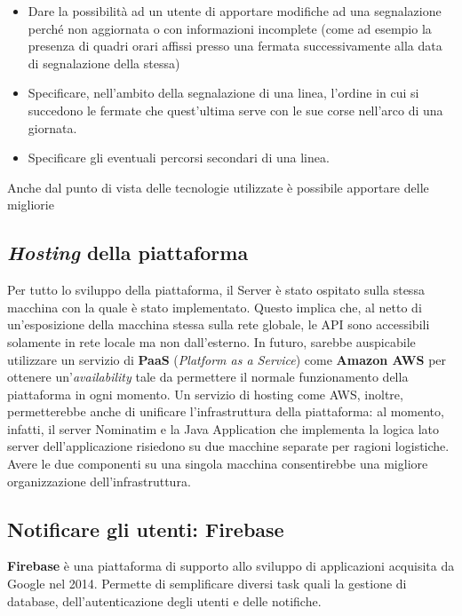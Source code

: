 		\begin{itemize}
			\item Dare la possibilità ad un utente di apportare modifiche ad una segnalazione perché non aggiornata o con informazioni incomplete (come ad esempio la presenza di quadri orari affissi presso una fermata successivamente alla data di segnalazione della stessa)
			\item Specificare, nell'ambito della segnalazione di una linea, l'ordine in cui si succedono le fermate che quest'ultima serve con le sue corse nell'arco di una giornata.
			\item Specificare gli eventuali percorsi secondari di una linea. 
		\end{itemize}

		Anche dal punto di vista delle tecnologie utilizzate è possibile apportare delle migliorie 

		\subsection{\textit{Hosting} della piattaforma}
			Per tutto lo sviluppo della piattaforma, il Server è stato ospitato sulla stessa macchina con la quale è stato implementato. Questo implica che, al netto di un'esposizione della macchina stessa sulla rete globale, le API sono accessibili solamente in rete locale ma non dall'esterno. In futuro, sarebbe auspicabile utilizzare un servizio di \textbf{PaaS} (\textit{Platform as a Service}) come \textbf{Amazon AWS} per ottenere un'\textit{availability} tale da permettere il normale funzionamento della piattaforma in ogni momento. Un servizio di hosting come AWS, inoltre, permetterebbe anche di unificare l'infrastruttura della piattaforma: al momento, infatti, il server Nominatim e la Java Application che implementa la logica lato server dell'applicazione risiedono su due macchine separate per ragioni logistiche. Avere le due componenti su una singola macchina consentirebbe una migliore organizzazione dell'infrastruttura.

		\subsection{Notificare gli utenti: Firebase}
			\textbf{Firebase} è una piattaforma di supporto allo sviluppo di applicazioni acquisita da Google nel 2014. Permette di semplificare diversi task quali la gestione di database, dell'autenticazione degli utenti e delle notifiche.

		
